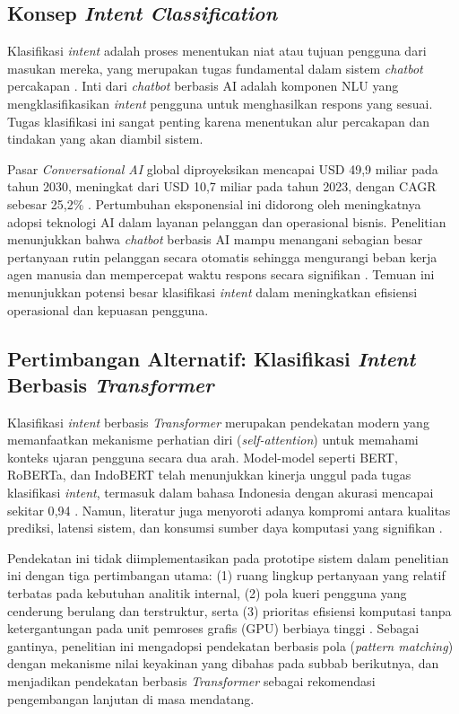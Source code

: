 \subsection{Konsep \textit{Intent Classification}}

Klasifikasi \textit{intent} adalah proses menentukan niat atau tujuan pengguna dari masukan mereka, yang merupakan tugas fundamental dalam sistem \textit{chatbot} percakapan \autocite{ouaddi2025comparative}. Inti dari \textit{chatbot} berbasis AI adalah komponen NLU\label{abbr:NLU} yang mengklasifikasikan \textit{intent} pengguna untuk menghasilkan respons yang sesuai. Tugas klasifikasi ini sangat penting karena menentukan alur percakapan dan tindakan yang akan diambil sistem.

Pasar \textit{Conversational AI} global diproyeksikan mencapai USD 49,9 miliar pada tahun 2030, meningkat dari USD 10,7 miliar pada tahun 2023, dengan CAGR sebesar 25,2\% \autocite{Qaltivate2025}. Pertumbuhan eksponensial ini didorong oleh meningkatnya adopsi teknologi AI dalam layanan pelanggan dan operasional bisnis. Penelitian menunjukkan bahwa \textit{chatbot} berbasis AI mampu menangani sebagian besar pertanyaan rutin pelanggan secara otomatis sehingga mengurangi beban kerja agen manusia dan mempercepat waktu respons secara signifikan \autocite{Adam2021Chatbots}. Temuan ini menunjukkan potensi besar klasifikasi \textit{intent} dalam meningkatkan efisiensi operasional dan kepuasan pengguna.

\subsection{Pertimbangan Alternatif: Klasifikasi \textit{Intent} Berbasis \textit{Transformer}}

Klasifikasi \textit{intent} berbasis \textit{Transformer} merupakan pendekatan modern yang memanfaatkan mekanisme perhatian diri (\textit{self-attention}) untuk memahami konteks ujaran pengguna secara dua arah. Model-model seperti BERT, RoBERTa, dan IndoBERT telah menunjukkan kinerja unggul pada tugas klasifikasi \textit{intent}, termasuk dalam bahasa Indonesia dengan akurasi mencapai sekitar 0{,}94 \autocite{Merugu2024IntentLLM,Ozerova2022IntentModule,Gehweiler2024IntentModeration}. Namun, literatur juga menyoroti adanya kompromi antara kualitas prediksi, latensi sistem, dan konsumsi sumber daya komputasi yang signifikan \autocite{Merugu2024IntentLLM,Gehweiler2025IntentSurvey}.

Pendekatan ini tidak diimplementasikan pada prototipe sistem dalam penelitian ini dengan tiga pertimbangan utama: (1) ruang lingkup pertanyaan yang relatif terbatas pada kebutuhan analitik internal, (2) pola kueri pengguna yang cenderung berulang dan terstruktur, serta (3) prioritas efisiensi komputasi tanpa ketergantungan pada unit pemroses grafis (GPU)\label{abbr:GPU} berbiaya tinggi \autocite{Ozerova2022IntentModule}. Sebagai gantinya, penelitian ini mengadopsi pendekatan berbasis pola (\textit{pattern matching}) dengan mekanisme nilai keyakinan yang dibahas pada subbab berikutnya, dan menjadikan pendekatan berbasis \textit{Transformer} sebagai rekomendasi pengembangan lanjutan di masa mendatang.

